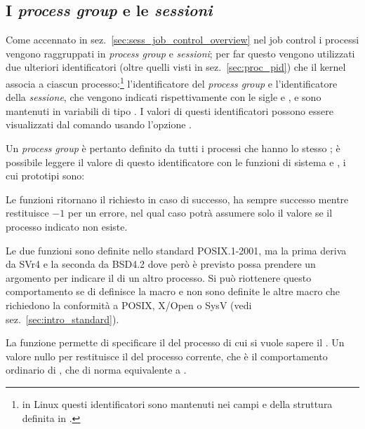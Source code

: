 \subsection{I \textit{process group} e le \textsl{sessioni}}
\label{sec:sess_proc_group}


Come accennato in sez.~\ref{sec:sess_job_control_overview} nel job control i
processi vengono raggruppati in \textit{process group} e \textsl{sessioni};
per far questo vengono utilizzati due ulteriori identificatori (oltre quelli
visti in sez.~\ref{sec:proc_pid}) che il kernel associa a ciascun
processo:\footnote{in Linux questi identificatori sono mantenuti nei campi
   e  della struttura  definita
  in .}  l'identificatore del \textit{process
  group} e l'identificatore della \textsl{sessione}, che vengono indicati
rispettivamente con le sigle  e , e sono mantenuti in
variabili di tipo . I valori di questi identificatori possono
essere visualizzati dal comando  usando l'opzione .

Un \textit{process group} è pertanto definito da tutti i processi che hanno lo
stesso ; è possibile leggere il valore di questo identificatore con
le funzioni di sistema  e , i cui prototipi
sono:

\begin{funcproto}{
}

{Le funzioni ritornano il  richiesto in caso di successo,
   ha sempre successo mentre  restituisce $-1$ per
  un errore, nel qual caso  potrà assumere solo il valore
   se il processo indicato non esiste.
}
\end{funcproto}

Le due funzioni sono definite nello standard POSIX.1-2001, ma la prima deriva
da SVr4 e la seconda da BSD4.2 dove però è previsto possa prendere un
argomento per indicare il  di un altro processo. Si può riottenere
questo comportamento se di definisce la macro  e non sono
definite le altre macro che richiedono la conformità a POSIX, X/Open o SysV
(vedi sez.~\ref{sec:intro_standard}).

La funzione  permette di specificare il  del processo
di cui si vuole sapere il . Un valore nullo per 
restituisce il  del processo corrente, che è il comportamento
ordinario di , che di norma equivalente a .

